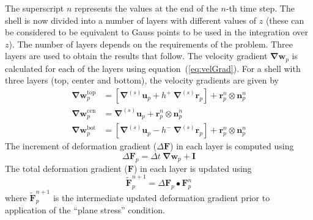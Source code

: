      The superscript $n$ represents the values at the end of the $n$-th time 
      step.  The shell is now divided into a number of layers with different 
      values of $z$ (these can be considered to be equivalent to Gauss points to
      be used in the integration over $z$).  The number of layers depends
      on the requirements of the problem.  Three layers are used to obtain the 
      results that follow.  
      The velocity gradient $\boldsymbol{\nabla}\mathbf{w}_p$ is calculated for
      each of the layers using equation~(\ref{eq:velGrad}).  For a shell with 
      three layers (top, center and bottom), the velocity gradients are
      given by
      \begin{align}
        \boldsymbol{\nabla}\mathbf{w}_p^{\text{top}} & = 
          \left[\boldsymbol{\nabla}^{(s)}\mathbf{u}_p+
          h^+~\boldsymbol{\nabla}^{(s)}\mathbf{r}_p\right] + 
          \mathbf{r}_p^n\otimes\mathbf{n}_p^n \\
        \boldsymbol{\nabla}\mathbf{w}_p^{\text{cen}} & = 
          \boldsymbol{\nabla}^{(s)}\mathbf{u}_p+
          \mathbf{r}_p^n\otimes\mathbf{n}_p^n \\
        \boldsymbol{\nabla}\mathbf{w}_p^{\text{bot}} & = 
          \left[\boldsymbol{\nabla}^{(s)}\mathbf{u}_p-
          h^-~\boldsymbol{\nabla}^{(s)}\mathbf{r}_p\right] + 
          \mathbf{r}_p^n\otimes\mathbf{n}_p^n 
      \end{align}
      The increment of deformation gradient ($\Delta\mathbf{F}$) in each layer 
      is computed using
      \begin{equation}
        \Delta\mathbf{F}_p = 
          \Delta t~\boldsymbol{\nabla}\mathbf{w}_p + \mathbf{I}
      \end{equation}
      The total deformation gradient ($\mathbf{F}$) in each layer is 
      updated using
      \begin{equation}
        \boldsymbol{\tilde{\mathbf{F}}}_p^{n+1} = 
          \Delta\mathbf{F}_p\bullet\mathbf{F}_p^{n}
      \end{equation}
      where $\boldsymbol{\tilde{\mathbf{F}}}_p^{n+1}$ is the intermediate 
      updated deformation gradient prior to application of the ``plane stress''
      condition.


